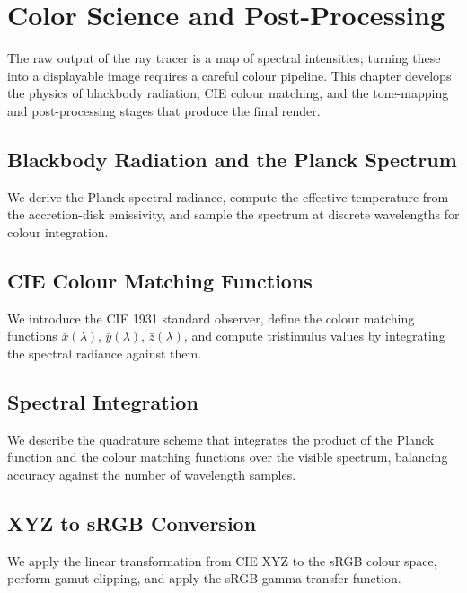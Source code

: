 \chapter{Color Science and Post-Processing}
\label{ch:color-science}

The raw output of the ray tracer is a map of spectral intensities; turning
these into a displayable image requires a careful colour pipeline. This chapter
develops the physics of blackbody radiation, CIE colour matching, and the
tone-mapping and post-processing stages that produce the final render.

\section{Blackbody Radiation and the Planck Spectrum}
\label{sec:col-blackbody}

We derive the Planck spectral radiance, compute the effective temperature from
the accretion-disk emissivity, and sample the spectrum at discrete wavelengths
for colour integration.

\section{CIE Colour Matching Functions}
\label{sec:col-cie}

We introduce the CIE 1931 standard observer, define the colour matching
functions $\bar{x}(\lambda)$, $\bar{y}(\lambda)$, $\bar{z}(\lambda)$, and
compute tristimulus values by integrating the spectral radiance against them.

\section{Spectral Integration}
\label{sec:col-spectral}

We describe the quadrature scheme that integrates the product of the Planck
function and the colour matching functions over the visible spectrum, balancing
accuracy against the number of wavelength samples.

\section{XYZ to sRGB Conversion}
\label{sec:col-xyz-srgb}

We apply the linear transformation from CIE XYZ to the sRGB colour space,
perform gamut clipping, and apply the sRGB gamma transfer function.

